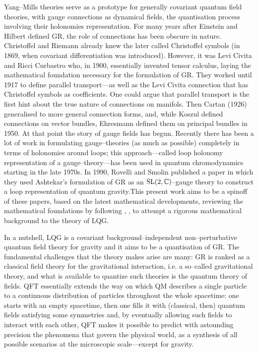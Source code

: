 Yang--Mills theories serve as a prototype for generally covariant quantum field theories, with gauge connections as dynamical fields, the quantisation process involving their holonomies representation.  For many years after Einstein and Hilbert defined GR, the role of connections has been obscure in nature. Christoffel and Riemann already knew the later called Christoffel symbols (in 1869, when covariant differentiation was introduced). However, it was Levi Civita and Ricci Curbastro who, in 1900, essentially invented tensor calculus, laying the mathematical foundation necessary for the formulation of GR. They worked until 1917 to define parallel transport---as well as the Levi Civita connection that has Christoffel symbols as coefficients. One could argue that parallel transport is the first hint about the true nature of connections on manifols. Then Cartan (1926) generalised to more general connection forms, and, while Koszul defined connections on vector bundles, Ehresmann defined them on principal bundles in 1950. At that point the story of gauge fields has begun. Recently there has been a lot of work in formulating gauge--theories (as much as possible) completely in terms of holonomies around loops; this approach---called loop holonomy representation of a gauge--theory---has been used in quantum chromodynamics starting in the late 1970s. In 1990, Rovelli and Smolin \cite{smolin} published a paper in which they used Ashtekar's formulation of GR as an $
\text{\normalfont SL}(2,\mathbb{C})$--gauge theory to construct a loop representation of quantum gravity.\quad This present work aims to be a spinoff of these papers, based on the latest mathematical developments, reviewing the mathematical foundations by following \cite{FFR1}, \cite{FFR2}, to attempt a rigorous mathematical background to the theory of LQG. %

In a nutshell, LQG is a covariant background--independent non--perturbative quantum field theory for gravity and it aims to be a quantisation of GR. The fundamental challenges that the theory makes arise are many:  GR is ranked as a classical field theory for the gravitational interaction, i.e. a so--called gravitational theory, and what is available to quantize such theories is the quantum theory of fields. QFT essentially extends the way on which QM describes a single particle to a continuous distribution of particles throughout the whole spacetime: one starts with an empty spacetime, then one fills it with (classical, then) quantum fields satisfying some symmetries and, by eventually allowing such fields to interact with each other, QFT makes it possible to predict with astounding precision the phenomena that govern the physical world, as a synthesis of all possible scenarios at the microscopic scale---except for gravity.

